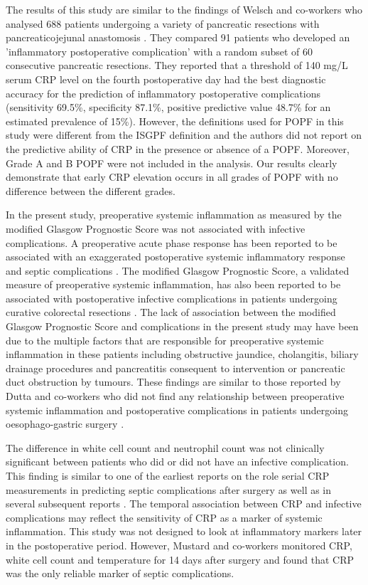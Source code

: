 The results of this study are similar to the findings of Welsch and co-workers who analysed 688 patients undergoing a variety of pancreatic resections with pancreaticojejunal anastomosis \parencite{welsch_persisting_2008}. They compared 91 patients who developed an 'inflammatory postoperative complication' with a random subset of 60 consecutive pancreatic resections. They reported that a threshold of 140 mg/L serum CRP level on the fourth postoperative day had the best diagnostic accuracy for the prediction of inflammatory postoperative complications (sensitivity 69.5\%, specificity 87.1\%, positive predictive value 48.7\% for an estimated prevalence of 15\%). However, the definitions used for POPF in this study were different from the ISGPF definition and the authors did not report on the predictive ability of CRP in the presence or absence of a POPF. Moreover, Grade A and B POPF were not included in the analysis. Our results clearly demonstrate that early CRP elevation occurs in all grades of POPF with no difference between the different grades.

In the present study, preoperative systemic inflammation as measured by the modified Glasgow Prognostic Score was not associated with infective complications. A preoperative acute phase response has been reported to be associated with an exaggerated postoperative systemic inflammatory response and septic complications \parencite{haupt_association_1997}. The modified Glasgow Prognostic Score, a validated measure of preoperative systemic inflammation, has also been reported to be associated with postoperative infective complications in patients undergoing curative colorectal resections \parencite{moyes_preoperative_2009}. The lack of association between the modified Glasgow Prognostic Score and complications in the present study may have been due to the multiple factors that are responsible for preoperative systemic inflammation in these patients including obstructive jaundice, cholangitis, biliary drainage procedures and pancreatitis consequent to intervention or pancreatic duct obstruction by tumours. These findings are similar to those reported by Dutta and co-workers who did not find any relationship between preoperative systemic inflammation and postoperative complications in patients undergoing oesophago-gastric surgery \parencite{dutta_persistent_2011}.

The difference in white cell count and neutrophil count was not clinically significant between patients who did or did not have an infective complication. This finding is similar to one of the earliest reports on the role serial CRP measurements in predicting septic complications after surgery \parencite{mustard_c-reactive_1987} as well as in several subsequent reports \parencite{matthiessen_increase_2008, welsch_persisting_2008, dutta_persistent_2011}. The temporal association between CRP and infective complications may reflect the sensitivity of CRP as a marker of systemic inflammation. This study was not designed to look at inflammatory markers later in the postoperative period. However, Mustard and co-workers monitored CRP, white cell count and temperature for 14 days after surgery and found that CRP was the only reliable marker of septic complications.

